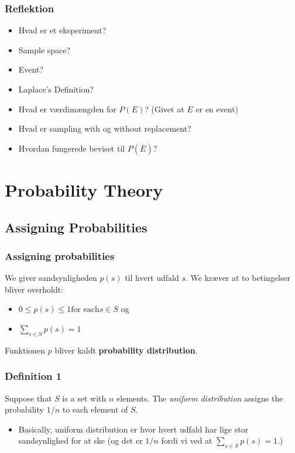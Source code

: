 \documentclass{beamer}
\begin{document}
\begin{frame}
  \frametitle{Reflektion}
 \begin{itemize}
 \item Hvad er et eksperiment?
 \item Sample space?
 \item Event?
 \item Laplace's Definition?
 \item Hvad er værdimængden for $P(E)$? (Givet at $E$ er en event)
 \item Hvad er sampling with og without replacement?
 \item Hvordan fungerede beviset til $P(\overline{E})$?
 \end{itemize} 
\end{frame}

\section{Probability Theory}
\label{sec:probability-theortheory}

\subsection{Assigning Probabilities}
\label{subsec:assigning-probabilities}


\begin{frame}
  \frametitle{Assigning probabilities}
  We giver sandsynligheden $p(s)$ til hvert udfald $s$. We kræver at to betingelser bliver overholdt:
  \begin{itemize}
  \item $0 \leq p(s) \leq 1 \text{for each} s \in S$ og
  \item $\sum_{s \in S}p(s) = 1$
  \end{itemize}
  Funktionen $p$ bliver kaldt \textbf{probability distribution}.
\end{frame}

\begin{frame}
  \frametitle{Definition 1}
  \begin{definition}
Suppose that $S$ is a set with $n$ elements. The \textit{uniform distribution} assigns the probability $1/n$ to each element of $S$.
  \end{definition}
 \begin{itemize}
 \item Basically, uniform distribution er hvor hvert udfald har lige stor sandsynlighed for at ske (og det er $1/n$ fordi vi ved at $\sum_{s \in S}^{}p(s) = 1$.)
 \end{itemize} 
\end{frame}
\end{document}
